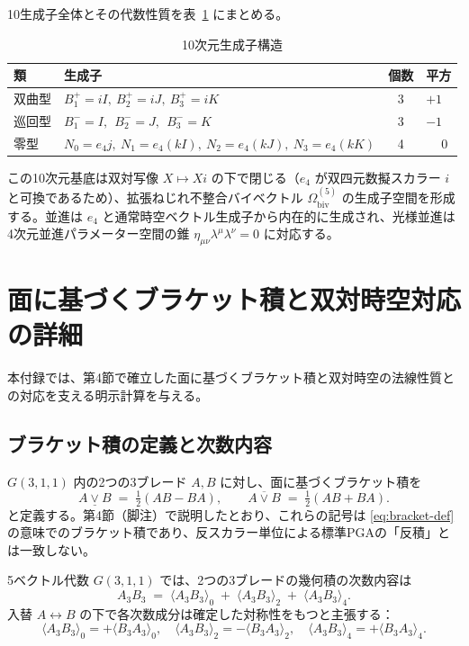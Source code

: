 \documentclass[11pt,a4paper]{article}
\begin{document}
10生成子全体とその代数性質を表~\ref{tab:generators} にまとめる。

\begin{table}[htbp]
\centering
\caption{10次元生成子構造}
\label{tab:generators}
\begin{tabular}{llcl}
\hline
類           & 生成子                                                                & 個数 & 平方 \\
\hline
双曲型       & \(B_{1}^{+}=iI,\ B_{2}^{+}=iJ,\ B_{3}^{+}=iK\)                        & 3     & \(+1\) \\
巡回型       & \(B_{1}^{-}=I,\ \ B_{2}^{-}=J,\ \ B_{3}^{-}=K\)                       & 3     & \(-1\) \\
零型         & \(N_{0}=e_{4}j,\ N_{1}=e_{4}(kI),\ N_{2}=e_{4}(kJ),\ N_{3}=e_{4}(kK)\) & 4     & \(\phantom{+}0\) \\
\hline
\end{tabular}
\end{table}

この10次元基底は双対写像 $X\mapsto Xi$ の下で閉じる（$e_{4}$ が双四元数擬スカラー $i$ と可換であるため）、拡張ねじれ不整合バイベクトル $\Omega_{\text{biv}}^{(5)}$ の生成子空間を形成する。並進は $e_{4}$ と通常時空ベクトル生成子から内在的に生成され、光様並進は4次元並進パラメーター空間の錐 $\eta_{\mu\nu}\lambda^{\mu}\lambda^{\nu}=0$ に対応する。

\section{面に基づくブラケット積と双対時空対応の詳細}

本付録では、第4節で確立した面に基づくブラケット積と双対時空の法線性質との対応を支える明示計算を与える。

\subsection{ブラケット積の定義と次数内容}

$G(3,1,1)$ 内の2つの3ブレード $A,B$ に対し、面に基づくブラケット積を
\[
A \mathbin{\underline{\vee}} B \;=\; \tfrac12 (AB - BA), \qquad
A \mathbin{\overline{\vee}} B \;=\; \tfrac12 (AB + BA).
\]
と定義する。第4節（脚注）で説明したとおり、これらの記号は \eqref{eq:bracket-def} の意味でのブラケット積であり、反スカラー単位による標準PGAの「反積」とは一致しない。

5ベクトル代数 $G(3,1,1)$ では、2つの3ブレードの幾何積の次数内容は
\[
A_{3}B_{3} \;=\; \langle A_{3}B_{3}\rangle_{0} \;+\; \langle A_{3}B_{3}\rangle_{2} \;+\; \langle A_{3}B_{3}\rangle_{4}.
\]
入替 $A\leftrightarrow B$ の下で各次数成分は確定した対称性をもつと主張する：
\begin{equation}
\langle A_{3}B_{3}\rangle_{0} = +\langle B_{3}A_{3}\rangle_{0},
\quad
\langle A_{3}B_{3}\rangle_{2} = -\langle B_{3}A_{3}\rangle_{2},
\quad
\langle A_{3}B_{3}\rangle_{4} = +\langle B_{3}A_{3}\rangle_{4}.
\label{eq:grade-symmetry}
\end{equation}
\end{document}
